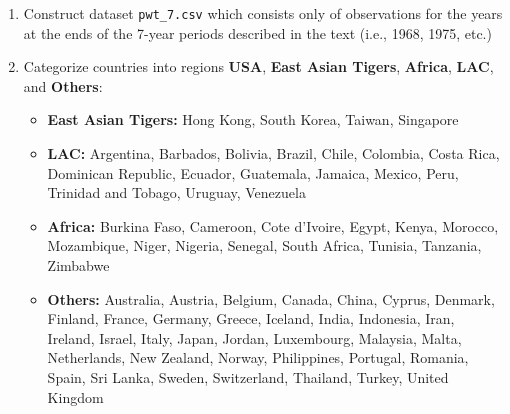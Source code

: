 \documentclass[12pt,english]{article}
\theoremstyle{remark}
\begin{document}
\begin{enumerate}
\begin{itemize}
	\end{itemize}
	\item Construct dataset \texttt{pwt\_7.csv} which consists only of observations for the years at the ends of the 7-year periods described in the text (i.e., 1968, 1975, etc.) 
	\item Categorize countries into regions \textbf{USA}, \textbf{East Asian Tigers}, \textbf{Africa}, \textbf{LAC}, and \textbf{Others}:
	\begin{itemize}
		\item \textbf{East Asian Tigers:} Hong Kong, South Korea, Taiwan, Singapore 
		\item \textbf{LAC:} Argentina, Barbados, Bolivia, Brazil, Chile, Colombia, Costa Rica, Dominican Republic, Ecuador, Guatemala, Jamaica, Mexico, Peru, Trinidad and Tobago, Uruguay, Venezuela
		\item \textbf{Africa:} Burkina Faso, Cameroon, Cote d'Ivoire, Egypt, Kenya, Morocco, Mozambique, Niger, Nigeria, Senegal, South Africa, Tunisia, Tanzania, Zimbabwe
		\item \textbf{Others:} Australia, Austria, Belgium, Canada, China, Cyprus, Denmark, Finland, France, Germany, Greece, Iceland, India, Indonesia, Iran, Ireland, Israel, Italy, Japan, Jordan, Luxembourg, Malaysia, Malta, Netherlands, New Zealand, Norway, Philippines, Portugal, Romania, Spain, Sri Lanka, Sweden, Switzerland, Thailand, Turkey, United Kingdom
	\end{itemize}
\end{enumerate}
\end{document}

